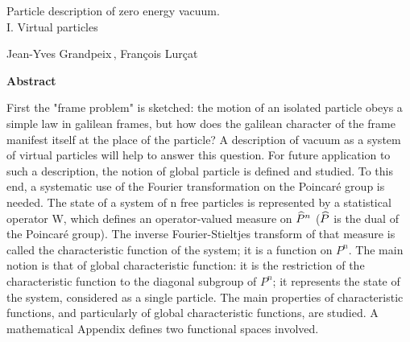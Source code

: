 \documentclass[a4paper,11pt]{article}
\begin{document}

\begin{center}

\vspace*{2cm}

\LARGE{Particle description of zero energy vacuum.\\
        I. Virtual particles}

\vspace{5mm}

\normalsize{Jean-Yves Grandpeix\,\footnotemark[1], Fran\c{c}ois Lur\c{c}at\,\footnotemark[2]}

\vspace{3cm}


{\bf Abstract}
\end{center}

\medskip


First the "frame problem" is sketched: the motion of an isolated particle obeys a simple law in 
galilean frames, but how does the galilean character of the frame manifest itself at the place 
of the particle? A description of vacuum as a system of virtual particles will help to answer 
this question. For future application to such a description, the notion of global particle is 
defined and studied. To this end, a systematic use of the Fourier transformation on the 
Poincar\'e  group is needed. The state of a system of n free particles is represented by a 
statistical operator W, which defines an operator-valued measure on $\widehat{P}^n$ ($\widehat{P}$ is the 
dual 
of the Poincar\'e  group). The inverse Fourier-Stieltjes transform of that measure is called the 
characteristic function of the system; it is a function on $P^n$. The main notion is that of 
global characteristic function: it is the restriction of the characteristic function to the 
diagonal subgroup of $P^n$; it represents the state of the system, considered as a single 
particle. The main properties of characteristic functions, and particularly of global 
characteristic functions, are studied. A mathematical Appendix defines two functional spaces 
involved.


\end{document}
